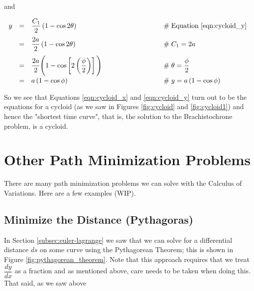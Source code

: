 \documentclass{article}
\theoremstyle{definition}
\begin{document}
\bigskip
\noindent
and

\bigskip
\begin{equation*}
\begin{array}{lllll}
y	
&=& \dfrac{C_1}{2} \left ( 1 - \cos 2 \theta \right )
			&\qquad \qquad \qquad \qquad \mathrel{\#} \text{Equation \ref{eqn:cycloid_y}} \\
[10pt]
&=& \dfrac{2a}{2} \left ( 1 - \cos 2 \theta \right )
			&\qquad \qquad \qquad \qquad \mathrel{\#} C_1 = 2 a \\
[10pt]
&=& \dfrac{2a}{2} \Bigg ( 1 - \cos \left [ 2 \left (\dfrac{\phi}{2} \right ) \right ] \Bigg )
			&\qquad \qquad \qquad \qquad \mathrel{\#} \theta = \dfrac{\phi}{2} \\
[10pt]
&=& a \left ( 1 - \cos \phi \right )
			&\qquad \qquad \qquad \qquad \mathrel{\#} y = a \left (1 - \cos \phi \right)
\end{array}
\end{equation*}


\bigskip
\noindent
So we see that Equations \ref{eqn:cycloid_x} and \ref{eqn:cycloid_y} 
turn out to be the equations for a cycloid (as we saw in Figures
\ref{fig:cycloid} and \ref{fig:cycloid1}) and hence the "shortest
time curve", that is, the solution to the Brachistochrone
problem, is a cycloid. 

\section{Other Path Minimization Problems}
There are many path minimization problems we can solve with the 
Calculus of Variations. Here are a few examples (WIP).

\subsection{Minimize the Distance (Pythagoras)}
{
In Section \ref{subsec:euler-lagrange} we saw that we can 
solve for a differential distance $ds$ on some curve using 
the Pythagorean Theorem; this is shown in Figure 
\ref{fig:pythagorean_theorem}. Note that this approach 
requires that we treat $\dfrac{dy}{dx}$ as a fraction 
and as mentioned above, care needs to be taken when doing 
this. That said, as we saw above \par}
\end{document}
